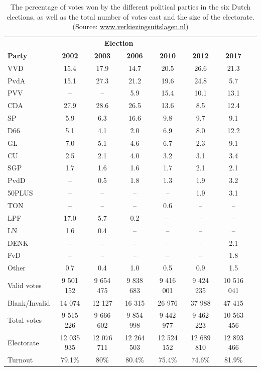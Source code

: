 \documentclass[12pt,letter]{article}\usepackage[]{graphicx}\usepackage[]{xcolor}
\begin{document}
\begin{table}
\renewcommand{\arraystretch}{1.25}
\centering
\footnotesize
\begin{tabular}{lccccccc}
\toprule
   & \multicolumn{4}{c}{\textbf{Election}} \\ \cmidrule{2-7}
\textbf{Party} & \textbf{2002} & \textbf{2003} & \textbf{2006} & \textbf{2010} & \textbf{2012} & \textbf{2017}\\ 
\midrule
VVD & 15.4 & 17.9 & 14.7 & 20.5 & 26.6 & 21.3 \\ 
PvdA & 15.1 & 27.3 & 21.2 & 19.6 & 24.8 & 5.7 \\ 
PVV & -- & -- & 5.9 & 15.4 & 10.1 & 13.1 \\ 
CDA & 27.9 & 28.6 & 26.5 & 13.6 & 8.5 & 12.4 \\ 
SP & 5.9 & 6.3 & 16.6 & 9.8 & 9.7 & 9.1 \\ 
D66 & 5.1 & 4.1 & 2.0 & 6.9 & 8.0 & 12.2 \\ 
GL & 7.0 & 5.1 & 4.6 & 6.7 & 2.3 & 9.1 \\ 
CU & 2.5 & 2.1 & 4.0 & 3.2 & 3.1 & 3.4 \\ 
SGP & 1.7 & 1.6 & 1.6 & 1.7 & 2.1 & 2.1 \\ 
PvdD & -- & 0.5 & 1.8 & 1.3 & 1.9 & 3.2 \\ 
50PLUS & -- & -- & -- & -- & 1.9 & 3.1 \\ 
TON & -- & -- & -- & 0.6 & -- & -- \\ 
LPF & 17.0 & 5.7 & 0.2 & -- & -- & -- \\ 
LN & 1.6 & 0.4 & -- & -- & -- & -- \\ 
DENK & -- & -- & -- & -- & -- & 2.1 \\ 
FvD & -- & -- & -- & -- & -- & 1.8 \\ 
Other & 0.7 & 0.4 & 1.0 & 0.5 & 0.9 & 1.5 \\ 
\midrule
Valid votes & 9 501 152 & 9 654 475 & 9 838 683 & 9 416 001 & 9 424 235 & 10 516 041 \\ 
Blank/Invalid & 14 074 & 12 127 & 16 315 & 26 976 & 37 988 & 47 415 \\ 
Total votes & 9 515 226 & 9 666 602 & 9 854 998 & 9 442 977 & 9 462 223 & 10 563 456 \\ 
\midrule
Electorate & 12 035 935 & 12 076 711 & 12 264 503 & 12 524 152 & 12 689 810 & 12 893 466\\
Turnout & 79.1\% & 80\% & 80.4\% & 75.4\% & 74.6\% & 81.9\% \\
\bottomrule
\end{tabular}
\caption{The percentage of votes won by the different political parties in the six Dutch elections, as well as the total number of votes cast and the size of the electorate. (Source: \href{http://www.verkiezingsuitslagen.nl}{www.verkiezingsuitslagen.nl})}
\label{T:NL_perc_vote}
\end{table}
\end{document}

